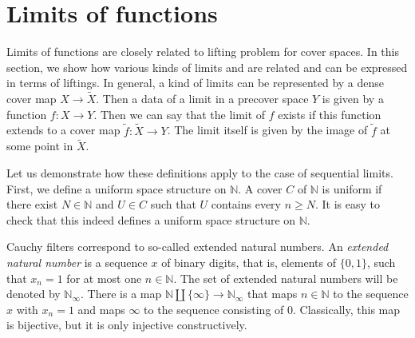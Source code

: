 \documentclass[reqno]{amsart}
\theoremstyle{definition}
\theoremstyle{remark}
\numberwithin{figure}{section}
\begin{document}
\section{Limits of functions}

Limits of functions are closely related to lifting problem for cover spaces.
In this section, we show how various kinds of limits and are related and can be expressed in terms of liftings.
In general, a kind of limits can be represented by a dense cover map $X \to \widetilde{X}$.
Then a data of a limit in a precover space $Y$ is given by a function $f : X \to Y$.
Then we can say that the limit of $f$ exists if this function extends to a cover map $\widetilde{f} : \widetilde{X} \to Y$.
The limit itself is given by the image of $\widetilde{f}$ at some point in $\widetilde{X}$.

Let us demonstrate how these definitions apply to the case of sequential limits.
First, we define a uniform space structure on $\mathbb{N}$.
A cover $C$ of $\mathbb{N}$ is uniform if there exist $N \in \mathbb{N}$ and $U \in C$ such that $U$ contains every $n \geq N$.
It is easy to check that this indeed defines a uniform space structure on $\mathbb{N}$.

Cauchy filters correspond to so-called extended natural numbers.
An \emph{extended natural number} is a sequence $x$ of binary digits, that is, elements of $\{ 0, 1 \}$, such that $x_n = 1$ for at most one $n \in \mathbb{N}$.
The set of extended natural numbers will be denoted by $\mathbb{N}_\infty$.
There is a map $\mathbb{N} \amalg \{ \infty \} \to \mathbb{N}_\infty$ that maps $n \in \mathbb{N}$ to the sequence $x$ with $x_n = 1$ and maps $\infty$ to the sequence consisting of $0$.
Classically, this map is bijective, but it is only injective constructively.
\end{document}
